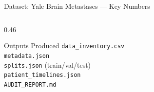 \documentclass[aspectratio=169, dvipsnames]{beamer}
\begin{document}
\begin{frame}{Dataset: Yale Brain Metastases — Key Numbers}
\begin{columns}
\begin{column}{0.46\textwidth}
            \begin{exampleblock}{Outputs Produced}
                \small
                 \texttt{data\_inventory.csv}\\
                 \texttt{metadata.json}\\
                 \texttt{splits.json} (train/val/test)\\
                 \texttt{patient\_timelines.json}\\
                 \texttt{AUDIT\_REPORT.md}
            \end{exampleblock}
        \end{column}
    \end{columns}
\end{frame}
\end{document}
